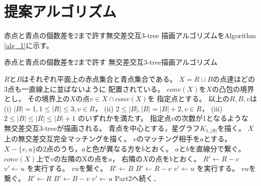 \documentclass[12pt,a4paper,oneside]{jsbook}
\theoremstyle{plain}
\begin{document}
\section{提案アルゴリズム}
赤点と青点の個数差を2まで許す無交差交互3-tree
描画アルゴリズムをAlgorithm \ref{alg_1}に示す。

\begin{algorithm}
\caption{赤点と青点の個数差を2まで許す
無交差交互3-tree描画アルゴリズム}
\label{alg_1}
\begin{algorithmic}[1]
\Require
$R$と$B$はそれぞれ平面上の赤点集合と青点集合である。
$X=R \cup B$の点達はどの3点も一直線上に並ばないように
配置されている。
$conv(X)$を$X$の凸包の境界とし，
その境界上の$X$の点$v \in X \cap conv(X)$を
指定点とする。
以上の$R,B,v$は
(i) $|B| = 1, 1 \le |R| \le 3, v \in R$，
(ii) $2 \le |B|, |R| = |B| + 2, v \in R$，
(iii) $2 \le |B| \le |R| \le |B| +1$
のいずれかを満たす。
\Ensure
指定点$v$の次数が1となるような
無交差交互3-treeが描画される。
\State 青点を中心とする，星グラフ$K_{1, |R|}$を描く。
\EndIf
{}
\State $X$上の無交差交互完全マッチングを描く。
\State $v$のマッチング相手を$a$とする。
\State $X - \{v, a\}$の2点のうち，$a$と色が異なる方を$b$とおく。
\State $a$と$b$を直線分で繋ぐ。
\EndIf
{}
\State $conv(X)$上で$v$の左隣のXの点を$a$，
右隣の$X$の点を$b$とおく。
\State $R' \leftarrow R - v$
\State $v' \leftarrow u$
\State {}を実行する。
\State $vu$を繋ぐ。
\EndIf
{}
\State $R' \leftarrow B$
\State $B' \leftarrow R - v$
\State $v' \leftarrow u$
\State {}を実行する。
\State $vu$を繋ぐ。
\EndIf
{}
\State $R' \leftarrow R$
\State $B' \leftarrow B - v$
\State $v' \leftarrow u$
\State \Comment Part2へ続く．
\end{algorithmic}
\end{algorithm}
\end{document}
